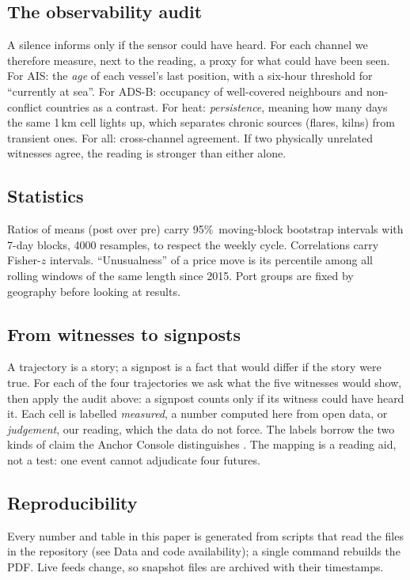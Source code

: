 \documentclass[10pt,twocolumn,letterpaper]{article}
\newcommand{\pct}{\%}
\begin{document}
\subsection{The observability audit}
A silence informs only if the sensor could have heard. For each channel we therefore measure, next to the reading, a proxy for what could have been seen. For AIS: the \emph{age} of each vessel's last position, with a six-hour threshold for ``currently at sea''. For ADS-B: occupancy of well-covered neighbours and non-conflict countries as a contrast. For heat: \emph{persistence}, meaning how many days the same 1\,km cell lights up, which separates chronic sources (flares, kilns) from transient ones. For all: cross-channel agreement. If two physically unrelated witnesses agree, the reading is stronger than either alone.

\subsection{Statistics}
Ratios of means (post over pre) carry 95\pct\ moving-block bootstrap intervals with 7-day blocks, 4000 resamples, to respect the weekly cycle. Correlations carry Fisher-$z$ intervals. ``Unusualness'' of a price move is its percentile among all rolling windows of the same length since 2015. Port groups are fixed by geography before looking at results.

\subsection{From witnesses to signposts}
A trajectory is a story; a signpost is a fact that would differ if the story were true. For each of the four trajectories we ask what the five witnesses would show, then apply the audit above: a signpost counts only if its witness could have heard it. Each cell is labelled \emph{measured}, a number computed here from open data, or \emph{judgement}, our reading, which the data do not force. The labels borrow the two kinds of claim the Anchor Console distinguishes \citep{anchorconsole}. The mapping is a reading aid, not a test: one event cannot adjudicate four futures.

\subsection{Reproducibility}
Every number and table in this paper is generated from scripts that read the files in the repository (see Data and code availability); a single command rebuilds the PDF. Live feeds change, so snapshot files are archived with their timestamps.
\end{document}
